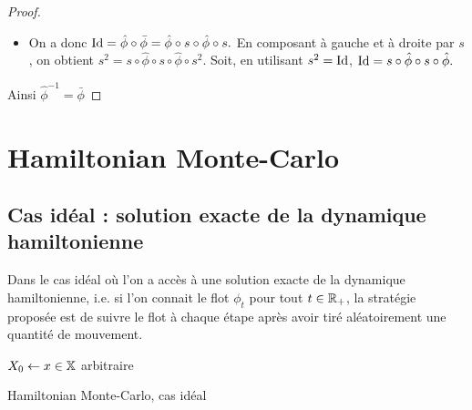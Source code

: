 \documentclass[10pt,a4paper]{article}
\begin{document}
\begin{proof}
\begin{itemize}
		\item On a donc
		$\operatorname{Id} = \hat \phi \circ \bar \phi = \hat \phi \circ s \circ \hat \phi \circ s.$
		En composant à gauche et à droite par $s$, on obtient
		$s^2 = s \circ \hat \phi \circ s \circ \hat \phi \circ s^2$.
		Soit, en utilisant $s^2 = \operatorname{Id}$,
		$\operatorname{Id} = s \circ \hat \phi \circ s \circ \hat \phi.$
	\end{itemize}
	Ainsi $\hat{\phi}^{-1} = \bar{\phi}$
\end{proof}


\section{Hamiltonian Monte-Carlo}

\subsection{Cas idéal : solution exacte de la dynamique hamiltonienne}

Dans le cas idéal où l'on a accès à une solution exacte de la dynamique hamiltonienne, i.e. si l'on connait le flot $\phi_t$ pour tout $t \in \mathbb{R}_+$, la stratégie proposée est de suivre le flot à chaque étape après avoir tiré aléatoirement une quantité de mouvement.

\begin{center}
	\begin{algorithm}[H]
		$X_0 \leftarrow x \in \mathbb{X}$ arbitraire\;
		\caption{Hamiltonian Monte-Carlo, cas idéal}
		\label{algo:HMC-ideal}
	\end{algorithm}
\end{center}
\end{document}
